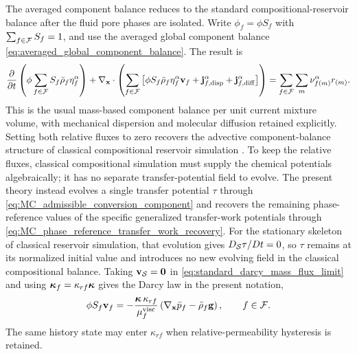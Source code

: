 The averaged component balance reduces to the standard compositional-reservoir
balance after the fluid pore phases are isolated.  Write
$\phi_f=\phi S_f$ with $\sum_{f\in\mathcal{F}}S_f=1$, and use the averaged global
component balance \eqref{eq:averaged_global_component_balance}.  The result is
%
\begin{equation}
	\frac{\partial}{\partial t}
	\left(\phi\sum_{f\in\mathcal{F}}S_f\bar\rho_f\eta_f^\alpha\right)
	+\nabla_{\mathbf{x}}\cdot
	\left(
	\sum_{f\in\mathcal{F}}
	\left[
	\phi S_f\bar\rho_f\eta_f^\alpha\mathbf{v}_f
	+
	\mathbf{j}_{f,{\rm disp}}^\alpha
	+
	\mathbf{j}_{f,{\rm diff}}^\alpha
	\right]
	\right)
	=\sum_{f\in\mathcal{F}}\sum_m\nu_{f (m)}^\alpha r_{(m)} .
	\label{eq:classical_total_mass_component_balance}
\end{equation}
%
This is the usual mass-based component balance per unit current mixture volume,
with mechanical dispersion and molecular diffusion retained explicitly.
Setting both relative fluxes to zero recovers the advective
component-balance structure of classical compositional reservoir simulation
\cite{balhoff2022multiphase}.  To keep the relative fluxes, classical compositional simulation must supply
the chemical potentials algebraically; it has no separate transfer-potential
field to evolve.  The present theory instead evolves a single transfer
potential \(\tau\) through
\eqref{eq:MC_admissible_conversion_component} and recovers the remaining
phase-reference values of the specific generalized transfer-work potentials through
\eqref{eq:MC_phase_reference_transfer_work_recovery}.  For the stationary
skeleton of classical reservoir simulation, that evolution gives
\(D_{\mathcal{S}}\tau/Dt=0\), so \(\tau\) remains at its normalized initial value
and introduces no new evolving field in the classical compositional balance.
Taking
\(\mathbf{v}_{\mathcal{S}}=\mathbf{0}\) in \eqref{eq:standard_darcy_mass_flux_limit} and using
$\boldsymbol{\kappa}_f=\kappa_{rf}\boldsymbol{\kappa}$ gives the Darcy law in the present
notation,
%
\begin{equation}
	\phi S_f\mathbf{v}_f
	=
	-\frac{\boldsymbol{\kappa}\,\kappa_{rf}}{\mu_f^{\mathrm{visc}}}
	\left(
	\nabla_{\mathbf{x}}\bar p_f-\bar\rho_f\mathbf{g}
	\right),
	\qquad
	f\in\mathcal{F} .
	\label{eq:classical_fixed_frame_darcy_velocity}
\end{equation}
%
The same history state may enter \(\kappa_{rf}\) when relative-permeability
hysteresis is retained.

